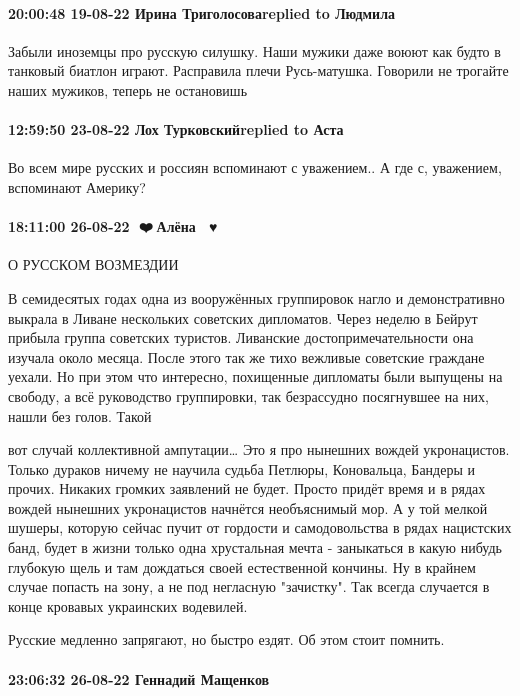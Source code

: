 \paragraph{20:00:48 19-08-22 Ирина Триголосоваreplied to Людмила}

Забыли иноземцы про русскую силушку. Наши мужики даже воюют как будто в
танковый биатлон играют. Расправила плечи Русь-матушка. Говорили не трогайте
наших мужиков, теперь не остановишь

\paragraph{12:59:50 23-08-22 Лох Турковскийreplied to Аста}

Во всем мире русских и россиян вспоминают с уважением.. А где с, уважением,
вспоминают Америку?

\paragraph{18:11:00 26-08-22 🖤❤️💛Алёна 🤍💙♥️}

О РУССКОМ ВОЗМЕЗДИИ

В семидесятых годах одна из вооружённых группировок нагло и демонстративно
выкрала в Ливане нескольких советских дипломатов. Через неделю в Бейрут прибыла
группа советских туристов. Ливанские достопримечательности она изучала около
месяца. После этого так же тихо вежливые советские граждане уехали. Но при этом
что интересно, похищенные дипломаты были выпущены на свободу, а всё руководство
группировки, так безрассудно посягнувшее на них, нашли без голов. Такой

вот случай коллективной ампутации… Это я про нынешних вождей укронацистов.
Только дураков ничему не научила судьба Петлюры, Коновальца, Бандеры и прочих.
Никаких громких заявлений не будет. Просто придёт время и в рядах вождей
нынешних укронацистов начнётся необъяснимый мор. А у той мелкой шушеры, которую
сейчас пучит от гордости и самодовольства в рядах нацистских банд, будет в
жизни только одна хрустальная мечта - заныкаться в какую нибудь глубокую щель и
там дождаться своей естественной кончины. Ну в крайнем случае попасть на зону,
а не под негласную "зачистку". Так всегда случается в конце кровавых украинских
водевилей.

Русские медленно запрягают, но быстро ездят. Об этом стоит помнить.

\paragraph{23:06:32 26-08-22 Геннадий Мащенков}

